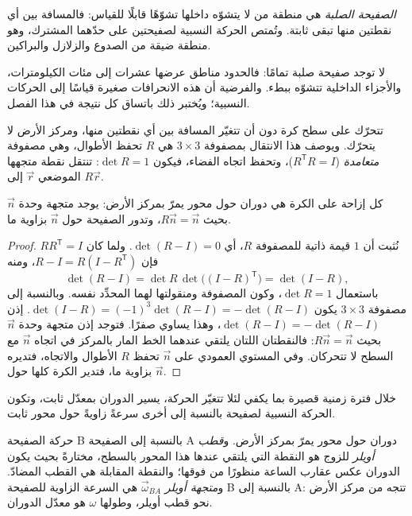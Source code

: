 \begin{definition}\label{def:b1:plate-kinematics:rigid-plate}
\emph{الصفيحة الصلبة} هي منطقة من  لا يتشوّه داخلها تشوّهًا قابلًا للقياس: فالمسافة بين أي نقطتين منها تبقى ثابتة. وتُمتص الحركة النسبية لصفيحتين على حدّهما المشترك، وهو منطقة ضيقة من الصدوع والزلازل والبراكين.
\end{definition}

لا توجد صفيحة صلبة تمامًا: فالحدود مناطق عرضها عشرات إلى مئات الكيلومترات، والأجزاء الداخلية تتشوّه ببطء. والفرضية أن هذه الانحرافات صغيرة قياسًا إلى الحركات النسبية؛ ويُختبر ذلك باتساق كل نتيجة في هذا الفصل.

تتحرّك  على سطح كرة دون أن تتغيّر المسافة بين أي نقطتين منها، ومركز الأرض لا يتحرّك. ويوصف هذا الانتقال بمصفوفة $3\times3$ هي $R$ تحفظ الأطوال، وهي مصفوفة \emph{متعامدة} ($R^{\mathsf T}R = I$)، وتحفظ اتجاه الفضاء، فيكون $\det R = 1$: تنتقل نقطة متجهها الموضعي $\vec r$ إلى $R\vec r$.

\begin{theorem}\label{thm:b1:plate-kinematics:euler}
كل إزاحة  على الكرة هي دوران حول محور يمرّ بمركز الأرض: يوجد متجهة وحدة $\vec n$ بحيث $R\vec n = \vec n$، وتدور الصفيحة حول $\vec n$ بزاوية ما.
\end{theorem}

\begin{proof}
نُثبت أن $1$ قيمة ذاتية للمصفوفة $R$، أي $\det(R - I) = 0$. ولما كان $R R^{\mathsf T} = I$ فإن $R - I = R(I - R^{\mathsf T})$، ومنه
\[
  \det(R - I) = \det R\,\det\bigl((I - R)^{\mathsf T}\bigr) = \det(I - R),
\]
باستعمال $\det R = 1$، وكون المصفوفة ومنقولتها لهما المحدِّد نفسه. وبالنسبة إلى مصفوفة $3\times3$ يكون
$\det(I - R) = (-1)^3\det(R - I) = -\det(R - I)$. إذن $\det(R - I) =
-\det(R - I)$، وهذا يساوي صفرًا. فتوجد إذن متجهة وحدة $\vec n$ بحيث $R\vec n = \vec n$: فالنقطتان اللتان يلتقي عندهما الخط المار بالمركز في اتجاه $\vec n$ مع السطح لا تتحركان. وفي المستوي العمودي على $\vec n$ تحفظ $R$ الأطوال والاتجاه، فتديره بزاوية ما، فتدير الكرة كلها حول $\vec n$.
\end{proof}

خلال فترة زمنية قصيرة بما يكفي لئلا تتغيّر الحركة، يسير الدوران بمعدّل ثابت، وتكون الحركة النسبية لصفيحة بالنسبة إلى أخرى سرعةً زاويةً حول محور ثابت.

\begin{definition}\label{def:b1:plate-kinematics:euler-pole}
حركة الصفيحة B بالنسبة إلى الصفيحة A دوران حول محور يمرّ بمركز الأرض. و\emph{قطب أويلر} للزوج هو النقطة التي يلتقي عندها هذا المحور بالسطح، مختارةً بحيث يكون الدوران عكس عقارب الساعة منظورًا من فوقها؛ والنقطة المقابلة هي القطب المضادّ. و\emph{متجهة أويلر} $\vec\omega_{BA}$ هي السرعة الزاوية للصفيحة B بالنسبة إلى A: تتجه من مركز الأرض نحو قطب أويلر، وطولها $\omega$ هو معدّل الدوران.
\end{definition}

